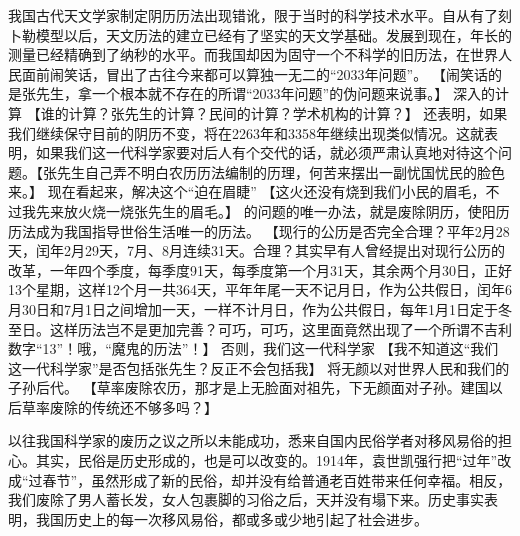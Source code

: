 我国古代天文学家制定阴历历法出现错讹，限于当时的科学技术水平。自从有了刻卜勒模型以后，天文历法的建立已经有了坚实的天文学基础。发展到现在，年长的测量已经精确到了纳秒的水平。而我国却因为固守一个不科学的旧历法，在世界人民面前闹笑话，冒出了古往今来都可以算独一无二的“2033年问题”。
\normalfont
【闹笑话的是张先生，拿一个根本就不存在的所谓“2033年问题”的伪问题来说事。】
\fangsong
深入的计算
\normalfont
【谁的计算？张先生的计算？民间的计算？学术机构的计算？】
\fangsong
还表明，如果我们继续保守目前的阴历不变，将在2263年和3358年继续出现类似情况。这就表明，如果我们这一代科学家要对后人有个交代的话，就必须严肃认真地对待这个问题。【张先生自己弄不明白农历历法编制的历理，何苦来摆出一副忧国忧民的脸色来。】
\fangsong
现在看起来，解决这个“迫在眉睫”
\normalfont
【这火还没有烧到我们小民的眉毛，不过我先来放火烧一烧张先生的眉毛。】
\fangsong
的问题的唯一办法，就是废除阴历，使阳历历法成为我国指导世俗生活唯一的历法。
\normalfont
【现行的公历是否完全合理？平年2月28天，闰年2月29天，7月、8月连续31天。合理？其实早有人曾经提出对现行公历的改革，一年四个季度，每季度91天，每季度第一个月31天，其余两个月30日，正好13个星期，这样12个月一共364天，平年年尾一天不记月日，作为公共假日，闰年6月30日和7月1日之间增加一天，一样不计月日，作为公共假日，每年1月1日定于冬至日。这样历法岂不是更加完善？可巧，可巧，这里面竟然出现了一个所谓不吉利数字“13”！哦，“魔鬼的历法”！】
\fangsong
否则，我们这一代科学家
\normalfont
【我不知道这“我们这一代科学家”是否包括张先生？反正不会包括我】
\fangsong
将无颜以对世界人民和我们的子孙后代。
\normalfont
【草率废除农历，那才是上无脸面对祖先，下无颜面对子孙。建国以后草率废除的传统还不够多吗？】

\fangsong
以往我国科学家的废历之议之所以未能成功，悉来自国内民俗学者对移风易俗的担心。其实，民俗是历史形成的，也是可以改变的。1914年，袁世凯强行把“过年”改成“过春节”，虽然形成了新的民俗，却并没有给普通老百姓带来任何幸福。相反，我们废除了男人蓄长发，女人包裹脚的习俗之后，天并没有塌下来。历史事实表明，我国历史上的每一次移风易俗，都或多或少地引起了社会进步。

